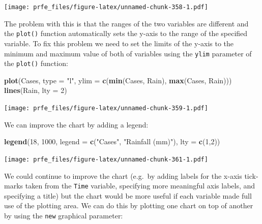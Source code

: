 \documentclass[12pt,a4paper]{book}
\newenvironment{Shaded}{\begin{snugshade}}{\end{snugshade}}
\newcommand{\DataTypeTok}[1]{\textcolor[rgb]{0.13,0.29,0.53}{#1}}
\newcommand{\DecValTok}[1]{\textcolor[rgb]{0.00,0.00,0.81}{#1}}
\newcommand{\KeywordTok}[1]{\textcolor[rgb]{0.13,0.29,0.53}{\textbf{#1}}}
\newcommand{\NormalTok}[1]{#1}
\newcommand{\StringTok}[1]{\textcolor[rgb]{0.31,0.60,0.02}{#1}}
\theoremstyle{definition}
\theoremstyle{definition}
\theoremstyle{definition}
\theoremstyle{remark}
\begin{document}
\texttt{[image: prfe\_files/figure-latex/unnamed-chunk-358-1.pdf]}

The problem with this is that the ranges of the two variables are
different and the \texttt{plot()} function automatically sets the y-axis
to the range of the specified variable. To fix this problem we need to
set the limits of the y-axis to the minimum and maximum value of both of
variables using the \texttt{ylim} parameter of the \texttt{plot()}
function:

\begin{Shaded}
\begin{Highlighting}[]
\KeywordTok{plot}\NormalTok{(Cases, }\DataTypeTok{type =} \StringTok{"l"}\NormalTok{, }\DataTypeTok{ylim =} \KeywordTok{c}\NormalTok{(}\KeywordTok{min}\NormalTok{(Cases, Rain), }\KeywordTok{max}\NormalTok{(Cases, Rain)))}
\KeywordTok{lines}\NormalTok{(Rain, }\DataTypeTok{lty =} \DecValTok{2}\NormalTok{)}
\end{Highlighting}
\end{Shaded}

\texttt{[image: prfe\_files/figure-latex/unnamed-chunk-359-1.pdf]}

We can improve the chart by adding a legend:

\begin{Shaded}
\begin{Highlighting}[]
\KeywordTok{legend}\NormalTok{(}\DecValTok{18}\NormalTok{, }\DecValTok{1000}\NormalTok{, }\DataTypeTok{legend =} \KeywordTok{c}\NormalTok{(}\StringTok{"Cases"}\NormalTok{, }\StringTok{"Rainfall (mm)"}\NormalTok{), }\DataTypeTok{lty =} \KeywordTok{c}\NormalTok{(}\DecValTok{1}\NormalTok{,}\DecValTok{2}\NormalTok{))}
\end{Highlighting}
\end{Shaded}

\texttt{[image: prfe\_files/figure-latex/unnamed-chunk-361-1.pdf]}

We could continue to improve the chart (e.g.~by adding labels for the
x-axis tick-marks taken from the \texttt{Time} variable, specifying more
meaningful axis labels, and specifying a title) but the chart would be
more useful if each variable made full use of the plotting area. We can
do this by plotting one chart on top of another by using the
\texttt{new} graphical parameter:
\end{document}
